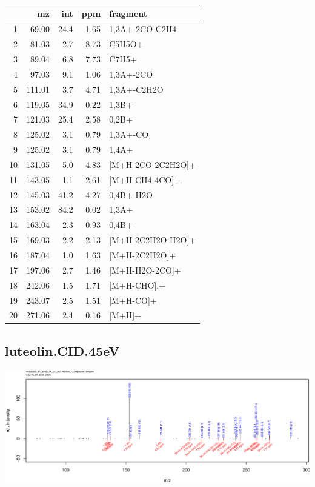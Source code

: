 \documentclass[]{article}
\begin{document}
\begin{table}[ht]
\centering
\begin{tabular}{rrrrl}
  \toprule
 & mz & int & ppm & fragment \\ 
  \midrule
1 & 69.00 & 24.4 & 1.65 & 1,3A+-2CO-C2H4 \\ 
  2 & 81.03 & 2.7 & 8.73 & C5H5O+ \\ 
  3 & 89.04 & 6.8 & 7.73 & C7H5+ \\ 
  4 & 97.03 & 9.1 & 1.06 & 1,3A+-2CO \\ 
  5 & 111.01 & 3.7 & 4.71 & 1,3A+-C2H2O \\ 
  6 & 119.05 & 34.9 & 0.22 & 1,3B+ \\ 
  7 & 121.03 & 25.4 & 2.58 & 0,2B+ \\ 
  8 & 125.02 & 3.1 & 0.79 & 1,3A+-CO \\ 
  9 & 125.02 & 3.1 & 0.79 & 1,4A+ \\ 
  10 & 131.05 & 5.0 & 4.83 & [M+H-2CO-2C2H2O]+ \\ 
  11 & 143.05 & 1.1 & 2.61 & [M+H-CH4-4CO]+ \\ 
  12 & 145.03 & 41.2 & 4.27 & 0,4B+-H2O \\ 
  13 & 153.02 & 84.2 & 0.02 & 1,3A+ \\ 
  14 & 163.04 & 2.3 & 0.93 & 0,4B+ \\ 
  15 & 169.03 & 2.2 & 2.13 & [M+H-2C2H2O-H2O]+ \\ 
  16 & 187.04 & 1.0 & 1.63 & [M+H-2C2H2O]+ \\ 
  17 & 197.06 & 2.7 & 1.46 & [M+H-H2O-2CO]+ \\ 
  18 & 242.06 & 1.5 & 1.71 & [M+H-CHO].+ \\ 
  19 & 243.07 & 2.5 & 1.51 & [M+H-CO]+ \\ 
  20 & 271.06 & 2.4 & 0.16 & [M+H]+ \\ 
   \bottomrule
\end{tabular}
\end{table}

\clearpage\subsection{luteolin.CID.45eV}
\includegraphics[width=\textwidth]{WEB350_files/figure-latex/unnamed-chunk-3-16}
\end{document}
